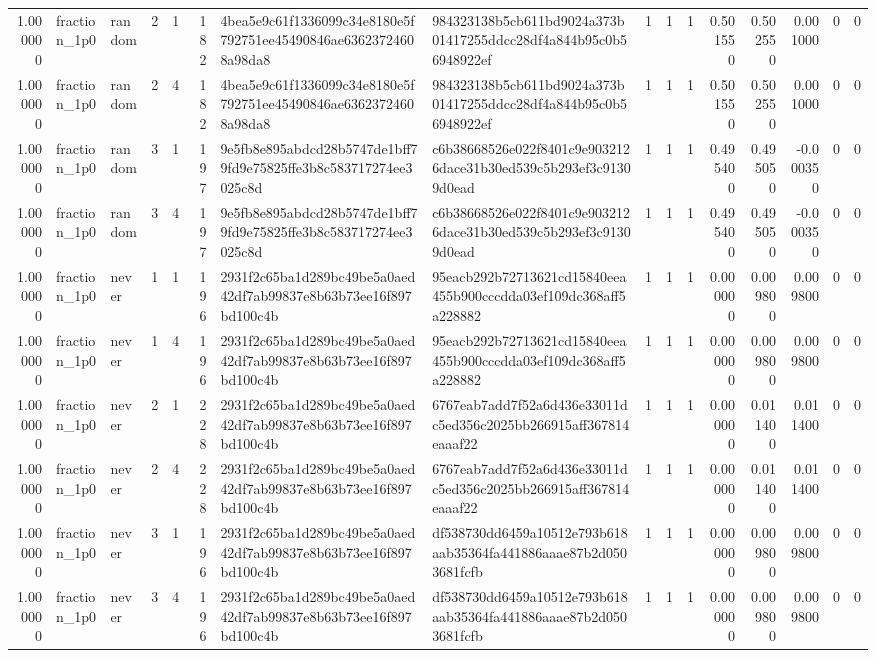 \begin{tabular}{rllrrrllrrrrrrrr}
1.000000 & fraction\_1p0 & random & 2 & 1 & 182 & 4bea5e9c61f1336099c34e8180e5f792751ee45490846ae63623724608a98da8 & 984323138b5cb611bd9024a373b01417255ddcc28df4a844b95c0b56948922ef & 1 & 1 & 1 & 0.501550 & 0.502550 & 0.001000 & 0 & 0 \\
1.000000 & fraction\_1p0 & random & 2 & 4 & 182 & 4bea5e9c61f1336099c34e8180e5f792751ee45490846ae63623724608a98da8 & 984323138b5cb611bd9024a373b01417255ddcc28df4a844b95c0b56948922ef & 1 & 1 & 1 & 0.501550 & 0.502550 & 0.001000 & 0 & 0 \\
1.000000 & fraction\_1p0 & random & 3 & 1 & 197 & 9e5fb8e895abdcd28b5747de1bff79fd9e75825ffe3b8c583717274ee3025c8d & c6b38668526e022f8401c9e9032126dace31b30ed539c5b293ef3c91309d0ead & 1 & 1 & 1 & 0.495400 & 0.495050 & -0.000350 & 0 & 0 \\
1.000000 & fraction\_1p0 & random & 3 & 4 & 197 & 9e5fb8e895abdcd28b5747de1bff79fd9e75825ffe3b8c583717274ee3025c8d & c6b38668526e022f8401c9e9032126dace31b30ed539c5b293ef3c91309d0ead & 1 & 1 & 1 & 0.495400 & 0.495050 & -0.000350 & 0 & 0 \\
1.000000 & fraction\_1p0 & never & 1 & 1 & 196 & 2931f2c65ba1d289bc49be5a0aed42df7ab99837e8b63b73ee16f897bd100c4b & 95eacb292b72713621cd15840eea455b900cccdda03ef109dc368aff5a228882 & 1 & 1 & 1 & 0.000000 & 0.009800 & 0.009800 & 0 & 0 \\
1.000000 & fraction\_1p0 & never & 1 & 4 & 196 & 2931f2c65ba1d289bc49be5a0aed42df7ab99837e8b63b73ee16f897bd100c4b & 95eacb292b72713621cd15840eea455b900cccdda03ef109dc368aff5a228882 & 1 & 1 & 1 & 0.000000 & 0.009800 & 0.009800 & 0 & 0 \\
1.000000 & fraction\_1p0 & never & 2 & 1 & 228 & 2931f2c65ba1d289bc49be5a0aed42df7ab99837e8b63b73ee16f897bd100c4b & 6767eab7add7f52a6d436e33011dc5ed356c2025bb266915aff367814eaaaf22 & 1 & 1 & 1 & 0.000000 & 0.011400 & 0.011400 & 0 & 0 \\
1.000000 & fraction\_1p0 & never & 2 & 4 & 228 & 2931f2c65ba1d289bc49be5a0aed42df7ab99837e8b63b73ee16f897bd100c4b & 6767eab7add7f52a6d436e33011dc5ed356c2025bb266915aff367814eaaaf22 & 1 & 1 & 1 & 0.000000 & 0.011400 & 0.011400 & 0 & 0 \\
1.000000 & fraction\_1p0 & never & 3 & 1 & 196 & 2931f2c65ba1d289bc49be5a0aed42df7ab99837e8b63b73ee16f897bd100c4b & df538730dd6459a10512e793b618aab35364fa441886aaae87b2d0503681fcfb & 1 & 1 & 1 & 0.000000 & 0.009800 & 0.009800 & 0 & 0 \\
1.000000 & fraction\_1p0 & never & 3 & 4 & 196 & 2931f2c65ba1d289bc49be5a0aed42df7ab99837e8b63b73ee16f897bd100c4b & df538730dd6459a10512e793b618aab35364fa441886aaae87b2d0503681fcfb & 1 & 1 & 1 & 0.000000 & 0.009800 & 0.009800 & 0 & 0 \\
\bottomrule
\end{tabular}
